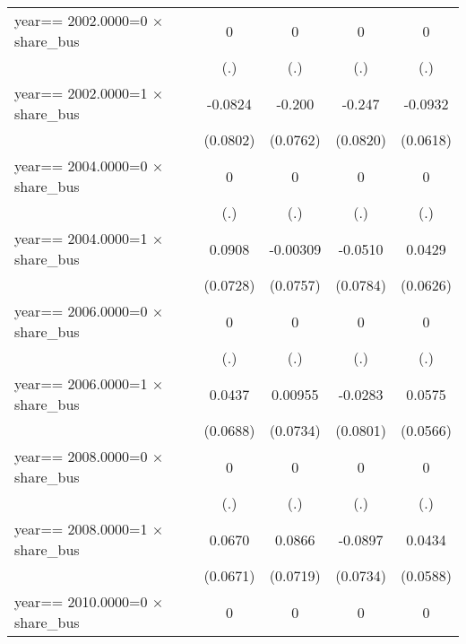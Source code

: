 \begin{table}[htbp]
\begin{tabular}{l*{4}{c}}
\addlinespace
year==  2002.0000=0 $\times$ share\_bus&        0         &        0         &        0         &        0         \\
                &      (.)         &      (.)         &      (.)         &      (.)         \\
\addlinespace
year==  2002.0000=1 $\times$ share\_bus&  -0.0824         &   -0.200\sym{***}&   -0.247\sym{***}&  -0.0932         \\
                & (0.0802)         & (0.0762)         & (0.0820)         & (0.0618)         \\
\addlinespace
year==  2004.0000=0 $\times$ share\_bus&        0         &        0         &        0         &        0         \\
                &      (.)         &      (.)         &      (.)         &      (.)         \\
\addlinespace
year==  2004.0000=1 $\times$ share\_bus&   0.0908         & -0.00309         &  -0.0510         &   0.0429         \\
                & (0.0728)         & (0.0757)         & (0.0784)         & (0.0626)         \\
\addlinespace
year==  2006.0000=0 $\times$ share\_bus&        0         &        0         &        0         &        0         \\
                &      (.)         &      (.)         &      (.)         &      (.)         \\
\addlinespace
year==  2006.0000=1 $\times$ share\_bus&   0.0437         &  0.00955         &  -0.0283         &   0.0575         \\
                & (0.0688)         & (0.0734)         & (0.0801)         & (0.0566)         \\
\addlinespace
year==  2008.0000=0 $\times$ share\_bus&        0         &        0         &        0         &        0         \\
                &      (.)         &      (.)         &      (.)         &      (.)         \\
\addlinespace
year==  2008.0000=1 $\times$ share\_bus&   0.0670         &   0.0866         &  -0.0897         &   0.0434         \\
                & (0.0671)         & (0.0719)         & (0.0734)         & (0.0588)         \\
\addlinespace
year==  2010.0000=0 $\times$ share\_bus&        0         &        0         &        0         &        0         \\

\end{tabular}
\end{table}
